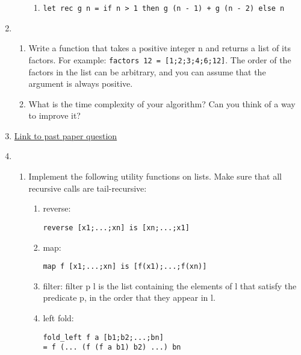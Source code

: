 \documentclass[11pt,a4paper]{article}
\begin{document}
\begin{enumerate}
\begin{enumerate}
\begin{enumerate}
        \item \begin{verbatim}
let rec g n = if n > 1 then g (n - 1) + g (n - 2) else n
\end{verbatim}
    \end{enumerate}
\end{enumerate}

\item 
\begin{enumerate}
    \item Write a function that takes a positive integer n and returns a list of its factors.  
    For example: \verb|factors 12 = [1;2;3;4;6;12]|.  
    The order of the factors in the list can be arbitrary, and you can assume that the argument is always positive.

    \item What is the time complexity of your algorithm? Can you think of a way to improve it?
\end{enumerate}

\item 
\href{https://www.cl.cam.ac.uk/teaching/exams/pastpapers/y1995p1q3.pdf}{Link to past paper question}

\item 
\begin{enumerate}
    \item Implement the following utility functions on lists.  
    Make sure that all recursive calls are tail-recursive:

    \begin{enumerate}
        \item reverse:
        \begin{verbatim}
reverse [x1;...;xn] is [xn;...;x1]
\end{verbatim}

        \item map:
        \begin{verbatim}
map f [x1;...;xn] is [f(x1);...;f(xn)]
\end{verbatim}

        \item filter: filter p l is the list containing the elements of l that 
        satisfy the predicate p, in the order that they appear in l.

        \item left fold:
        \begin{verbatim}
fold_left f a [b1;b2;...;bn]
= f (... (f (f a b1) b2) ...) bn
\end{verbatim}
    \end{enumerate}
\end{enumerate}

\end{enumerate}
\end{document}
